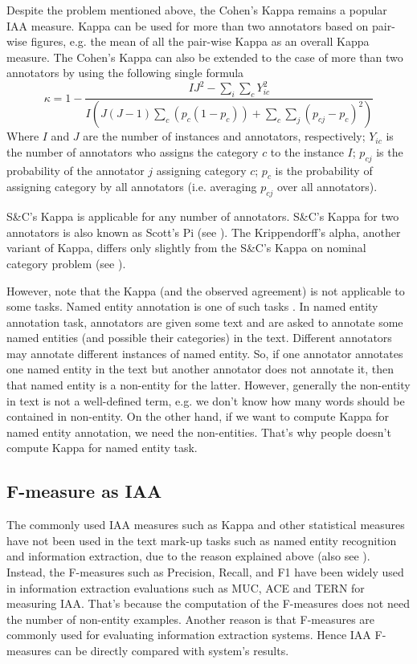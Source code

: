 Despite the problem mentioned above, the Cohen's Kappa remains a popular IAA measure. 
Kappa can be used for more than two annotators based on pair-wise figures, e.g. the mean
of all the pair-wise Kappa as an overall Kappa measure. The Cohen's Kappa can also be
extended to the case of more than two annotators by using the following single 
formula  \cite{Davies82}
\begin{equation}
\kappa = 1-\frac{IJ^{2}-\sum_{i}\sum_{c}Y_{ic}^{2}}
{I(J(J-1)\sum_{c}(p_{c}(1-p_{c}))+ \sum_{c}\sum_{j}(p_{cj}-p_{c})^2)}
\end{equation}
Where $I$ and $J$ are the number of instances and annotators, respectively; $Y_{ic}$ 
is the number of annotators who assigns the category $c$ to the instance $I$; $p_{cj}$ 
is the probability of the annotator $j$ assigning category $c$; $p_{c}$ is the 
probability of assigning category by all annotators (i.e. averaging $p_{cj}$  
over all annotators).

S\&C's Kappa is applicable for any number of annotators. S\&C's Kappa
for two annotators is also known as Scott's Pi (see \cite{Lombard02}). The Krippendorff's 
alpha, another variant of Kappa, differs only slightly from the S\&C's Kappa 
on nominal category problem (see \cite{Carletta96, Eugenio04}).

However, note that the Kappa (and the observed agreement) is not applicable to some
tasks. Named entity annotation is  one of such tasks
\cite{Hripcsak05}. In named entity annotation task, annotators are given 
some text and are asked to annotate some named entities (and possible their 
categories) in the text. Different annotators may annotate different instances
of named entity. So, if one annotator annotates one named entity in the text but
another annotator does not annotate it, then that named entity is a non-entity
for the latter. However, generally the non-entity in text is not a well-defined 
term, e.g. we don't know how many words should be contained in non-entity. On the 
other hand, if we want to compute Kappa for named entity annotation, we need
the non-entities. That's why people doesn't compute Kappa for named entity task.

\subsection{F-measure as IAA}

The commonly used IAA measures such as Kappa and other statistical measures have 
not been used in the text mark-up tasks such as named entity recognition and 
information extraction, due to the reason explained above (also see \cite{Hripcsak05}). 
Instead, the F-measures such as Precision, Recall, and F1 have been widely used 
in information extraction evaluations such as MUC, ACE and TERN for measuring IAA. 
That's because the computation of the F-measures does not need the number of 
non-entity examples. Another reason is that F-measures are commonly used for 
evaluating information extraction systems. Hence IAA F-measures can be directly 
compared with system's results.

